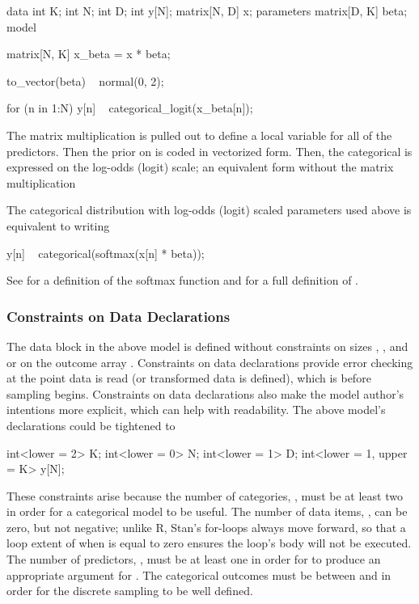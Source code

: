 \begin{stancode}
data {
  int K;
  int N;
  int D;
  int y[N];
  matrix[N, D] x;
}
parameters {
  matrix[D, K] beta;
}
model {
  matrix[N, K] x_beta = x * beta;

  to_vector(beta) ~ normal(0, 2);

  for (n in 1:N)
    y[n] ~ categorical_logit(x_beta[n]);
}
\end{stancode}
%
The matrix multiplication is pulled out to define a local variable for
all of the predictors.   Then the prior on  is coded in
vectorized form.    Then, the categorical is expressed on the log-odds
(logit) scale; an equivalent form without the matrix multiplication

The categorical distribution with log-odds (logit) scaled parameters
used above is equivalent to writing
%
\begin{stancode}
    y[n] ~ categorical(softmax(x[n] * beta));
\end{stancode}
%
See  for a definition of the softmax function and
 for a full definition of
.


\subsubsection{Constraints on Data Declarations}

The data block in the above model is defined without constraints on
sizes , , and  or on the outcome array
.  Constraints on data declarations provide error checking at
the point data is read (or transformed data is defined), which is
before sampling begins.  Constraints on data declarations also make
the model author's intentions more explicit, which can help with
readability.  The above model's declarations could be tightened to
%

\begin{stancode}
  int<lower = 2> K;
  int<lower = 0> N;
  int<lower = 1> D;
  int<lower = 1, upper = K> y[N];
\end{stancode}
%
These constraints arise because the number of categories, ,
must be at least two in order for a categorical model to be useful.
The number of data items, , can be zero, but not negative;
unlike R, Stan's for-loops always move forward, so that a loop extent
of  when  is equal to zero ensures the loop's body
will not be executed.  The number of predictors, , must be at
least one in order for  to produce an
appropriate argument for .  The categorical outcomes
 must be between  and  in order for the
discrete sampling to be well defined.

